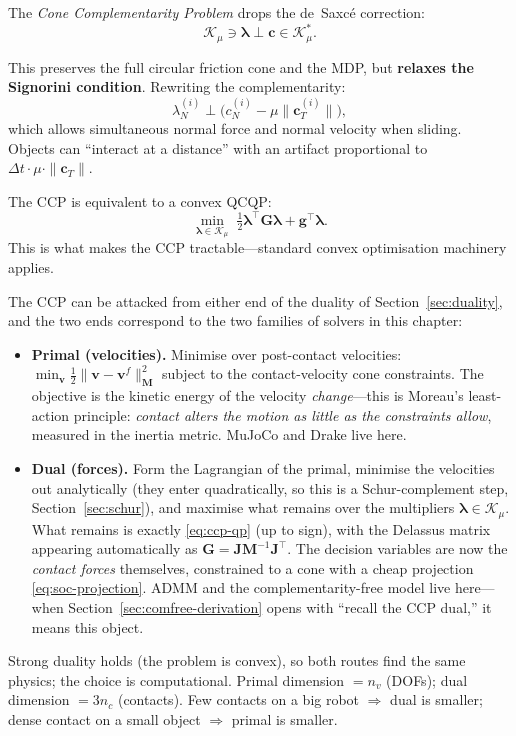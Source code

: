 \documentclass[11pt,twoside]{report}
\theoremstyle{definition}
\theoremstyle{plain}
\theoremstyle{remark}
\newcommand{\0}{\bm{0}}
\newcommand{\M}{\bm{M}}
\newcommand{\J}{\bm{J}}
\newcommand{\Kc}{\mathcal{K}}
\begin{document}
The \emph{Cone Complementarity Problem} drops the de~Saxc\'e correction:
\begin{equation}\label{eq:ccp}
\Kc_{\mu}\ni\bm{\lambda}\perp\bm{c}\in\Kc_{\mu}^{*}.
\end{equation}

This preserves the full circular friction cone and the MDP, but
\textbf{relaxes the Signorini condition}.  Rewriting the complementarity:
\begin{equation}
\lambda_{N}^{(i)}\perp\bigl(c_{N}^{(i)}-\mu\|\bm{c}_{T}^{(i)}\|\bigr),
\end{equation}
which allows simultaneous normal force and normal velocity when sliding.
Objects can ``interact at a distance'' with an artifact proportional to
$\Delta t\cdot\mu\cdot\|\bm{c}_{T}\|$.

The CCP is equivalent to a convex QCQP:
\begin{equation}\label{eq:ccp-qp}
\min_{\bm{\lambda}\in\Kc_{\mu}}\;\tfrac12\bm{\lambda}^{\!\top}\bm{G}\bm{\lambda}
+\bm{g}^{\!\top}\bm{\lambda}.
\end{equation}
This is what makes the CCP tractable---standard convex optimisation
machinery applies.

\begin{insightbox}
The CCP can be attacked from either end of the duality of
Section~\ref{sec:duality}, and the two ends correspond to the two
families of solvers in this chapter:
\begin{itemize}
\item \textbf{Primal (velocities).} Minimise over post-contact
      velocities:
      $\min_{\bm{v}}\tfrac12\|\bm{v}-\bm{v}^{f}\|_{\M}^{2}$
      subject to the contact-velocity cone constraints. The objective
      is the kinetic energy of the velocity \emph{change}---this is
      Moreau's least-action principle: \emph{contact alters the motion
      as little as the constraints allow}, measured in the inertia
      metric. MuJoCo and Drake live here.
\item \textbf{Dual (forces).} Form the Lagrangian of the primal,
      minimise the velocities out analytically (they enter
      quadratically, so this is a Schur-complement step,
      Section~\ref{sec:schur}), and maximise what remains over the
      multipliers $\bm{\lambda}\in\Kc_{\mu}$. What remains is exactly
      \eqref{eq:ccp-qp} (up to sign), with the Delassus matrix
      appearing automatically as
      $\bm{G}=\J\M^{-1}\J^{\!\top}$.
      The decision variables are now the \emph{contact forces}
      themselves, constrained to a cone with a cheap projection
      \eqref{eq:soc-projection}. ADMM and the complementarity-free
      model live here---when Section~\ref{sec:comfree-derivation}
      opens with ``recall the CCP dual,'' it means this object.
\end{itemize}
Strong duality holds (the problem is convex), so both routes find the
same physics; the choice is computational. Primal dimension $=n_{v}$
(DOFs); dual dimension $=3n_{c}$ (contacts). Few contacts on a big
robot $\Rightarrow$ dual is smaller; dense contact on a small object
$\Rightarrow$ primal is smaller.
\end{insightbox}
\end{document}
